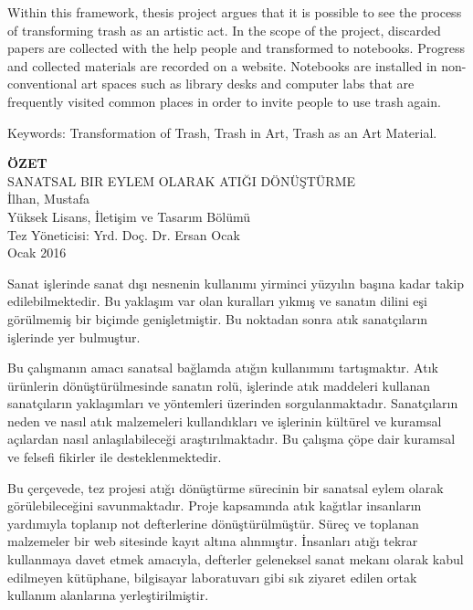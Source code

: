 \documentclass[12pt]{report}
\begin{document}
Within this framework, thesis project argues that it is possible to see the process of transforming trash as an artistic act. In the scope of the project, discarded papers are collected with the help people and transformed to notebooks. Progress and collected materials are recorded on a website. Notebooks are installed in non-conventional art spaces such as library desks and computer labs that are frequently visited common places in order to invite people to use trash again. 

\noindent Keywords: Transformation of Trash, Trash in Art, Trash as an Art Material.
\clearpage


\thispagestyle{plain}
{}
\doublespacing
\begin{center}
	\vspace*{13.5mm} %
	{\fontsize{14pt}{14pt}\selectfont \textbf{\MakeUppercase{Özet}}}\\
    \vspace{\baselineskip}
    \MakeUppercase{Sanatsal Bir Eylem Olarak Atığı Dönüştürme}\\
    İlhan, Mustafa\\
    Yüksek Lisans, İletişim ve Tasarım Bölümü\\
    Tez Yöneticisi: Yrd. Doç. Dr. Ersan Ocak\\
    \vspace{\baselineskip}
    Ocak 2016
\end{center}
\par Sanat işlerinde sanat dışı nesnenin kullanımı yirminci yüzyılın başına kadar takip edilebilmektedir. Bu yaklaşım var olan kuralları yıkmış ve sanatın dilini eşi görülmemiş bir biçimde genişletmiştir. Bu noktadan sonra atık sanatçıların işlerinde yer bulmuştur.

Bu çalışmanın amacı sanatsal bağlamda atığın kullanımını tartışmaktır. Atık ürünlerin dönüştürülmesinde sanatın rolü, işlerinde atık maddeleri kullanan sanatçıların yaklaşımları ve yöntemleri üzerinden sorgulanmaktadır. Sanatçıların neden ve nasıl atık malzemeleri kullandıkları ve işlerinin kültürel ve kuramsal açılardan nasıl anlaşılabileceği araştırılmaktadır. Bu çalışma çöpe dair kuramsal ve felsefi fikirler ile desteklenmektedir.

Bu çerçevede, tez projesi atığı dönüştürme sürecinin bir sanatsal eylem olarak görülebileceğini savunmaktadır. Proje kapsamında atık kağıtlar insanların yardımıyla toplanıp not defterlerine dönüştürülmüştür. Süreç ve toplanan malzemeler bir web sitesinde kayıt altına alınmıştır. İnsanları atığı tekrar kullanmaya davet etmek amacıyla, defterler geleneksel sanat mekanı olarak kabul edilmeyen kütüphane, bilgisayar laboratuvarı gibi sık ziyaret edilen ortak kullanım alanlarına yerleştirilmiştir.
\end{document}
